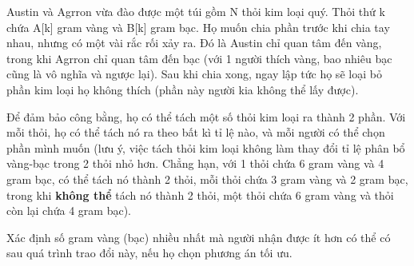 Austin và Agrron vừa đào được một túi gồm N thỏi kim loại quý. Thỏi thứ k chứa A[k] gram vàng và B[k] gram bạc. Họ muốn chia phần trước khi chia tay nhau, nhưng có một vài rắc rối xảy ra. Đó là Austin chỉ quan tâm đến vàng, trong khi Agrron chỉ quan tâm đến bạc (với 1 người thích vàng, bao nhiêu bạc cũng là vô nghĩa và ngược lại). Sau khi chia xong, ngay lập tức họ sẽ loại bỏ phần kim loại họ không thích (phần này người kia không thể lấy được).  



   Để đảm bảo công bằng, họ có thể tách một số thỏi kim loại ra thành 2 phần. Với mỗi thỏi, họ có thể tách nó ra theo bất kì tỉ lệ nào, và mỗi người có thể chọn phần mình muốn (lưu ý, việc tách thỏi kim loại không làm thay đổi tỉ lệ phân bổ vàng-bạc trong 2 thỏi nhỏ hơn. Chẳng hạn, với 1 thỏi chứa 6 gram vàng và 4 gram bạc, có thể tách nó thành 2 thỏi, mỗi thỏi chứa 3 gram vàng và 2 gram bạc, trong khi   \textbf{    không thể   }   tách nó thành 2 thỏi, một thỏi chứa 6 gram vàng và thỏi còn lại chứa 4 gram bạc).  



   Xác định số gram vàng (bạc) nhiều nhất mà người nhận được ít hơn có thể có sau quá trình trao đổi này, nếu họ chọn phương án tối ưu.